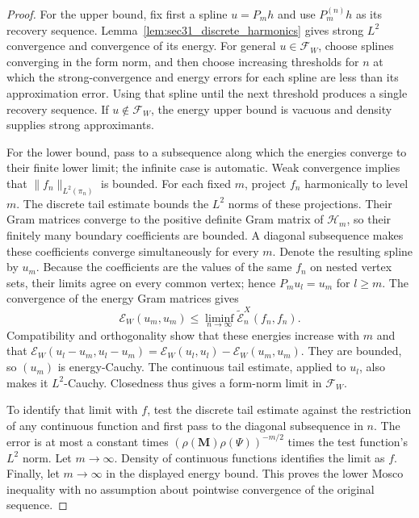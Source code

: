 \documentclass{article}
\theoremstyle{plain}
\theoremstyle{definition}
\begin{document}
\begingroup\color{red}
\begin{proof}
For the upper bound, fix first a spline $u=P_m h$ and use
$P_m^{(n)}h$ as its recovery sequence.
Lemma~\ref{lem:sec31_discrete_harmonics} gives strong $L^2$ convergence
and convergence of its energy. For general $u\in\mathcal F_W$, choose
splines converging in the form norm, and then choose increasing thresholds
for $n$ at which the strong-convergence and energy errors for each spline
are less than its approximation error. Using that spline until the next
threshold produces a single recovery sequence. If $u\notin\mathcal F_W$,
the energy upper bound is vacuous and density supplies strong approximants.

For the lower bound, pass to a subsequence along which the energies converge
to their finite lower limit; the infinite case is automatic.
Weak convergence implies that $\|f_n\|_{L^2(\pi_n)}$ is bounded.
For each fixed $m$, project $f_n$ harmonically to level $m$.
The discrete tail estimate bounds the $L^2$ norms of these projections.
Their Gram matrices converge to the positive definite Gram matrix of
$\mathcal H_m$, so their finitely many boundary coefficients are bounded.
A diagonal subsequence makes these coefficients converge simultaneously
for every $m$. Denote the resulting spline by $u_m$.
Because the coefficients are the values of the same $f_n$ on nested
vertex sets, their limits agree on every common vertex; hence
$P_m u_l=u_m$ for $l\ge m$.
The convergence of the energy Gram matrices gives
\[
\mathcal E_W(u_m,u_m)\le
\liminf_{n\to\infty}\widetilde{\mathcal E}_n^X(f_n,f_n).
\]
Compatibility and orthogonality show that these energies increase with $m$
and that
$\mathcal E_W(u_l-u_m,u_l-u_m)=\mathcal E_W(u_l,u_l)-\mathcal E_W(u_m,u_m)$.
They are bounded, so $(u_m)$ is energy-Cauchy.
The continuous tail estimate, applied to $u_l$, also makes it $L^2$-Cauchy.
Closedness thus gives a form-norm limit in $\mathcal F_W$.

To identify that limit with $f$, test the discrete tail estimate against
the restriction of any continuous function and first pass to the diagonal
subsequence in $n$. The error is at most a constant times
$(\rho(\mathbf M)\rho(\Psi))^{-m/2}$ times the test function's $L^2$ norm.
Let $m\to\infty$. Density of continuous functions identifies the limit as
$f$. Finally, let $m\to\infty$ in the displayed energy bound.
This proves the lower Mosco inequality with no assumption about pointwise
convergence of the original sequence.
\end{proof}
\endgroup{}
\end{document}
